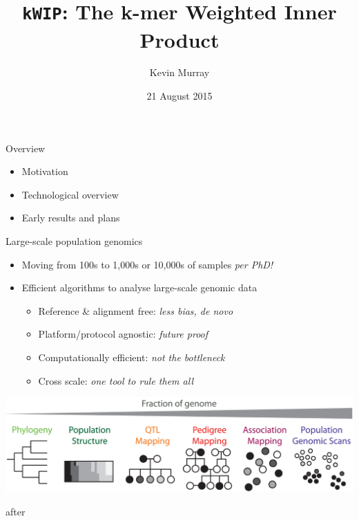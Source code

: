 \documentclass[t]{beamer}
\title{\texttt{kWIP}: The k-mer Weighted Inner Product}
\author{Kevin Murray}
\institute{PhD Candidate, Borevitz Lab, CPEB, ANU}
\date{21 August 2015}
\begin{document}
{
\begin{frame}
  \titlepage
  \vfill
\end{frame}
}

\begin{frame}{Overview}
  \begin{itemize}
    \item Motivation
    \item Technological overview
    \item Early results and plans
  \end{itemize}
\end{frame}

\begin{frame}{Large-scale population genomics}
  \begin{itemize}
    \item Moving from 100s to 1,000s or 10,000s of samples \textit{per PhD!}
      \pause
    \item Efficient algorithms to analyse large-scale genomic data
    \begin{itemize}
      \item Reference \& alignment free: \textit{less bias, de novo}
      \item Platform/protocol agnostic: \textit{future proof}
      \item Computationally efficient: \textit{not the bottleneck}
      \item Cross scale: \textit{one tool to rule them all}
    \end{itemize}
  \end{itemize}
  \begin{center}
    \includegraphics[width=\textwidth]{img/cross-scale.png}
  \end{center}
  \tiny{after \textcite{peterson_double_2012}}
\end{frame}
\end{document}
